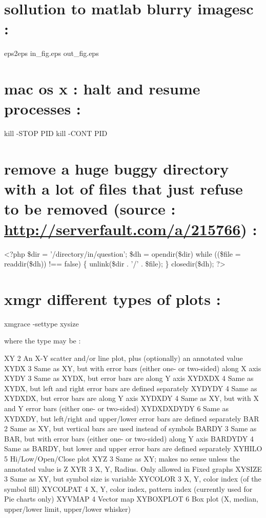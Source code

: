 \documentclass[11pt]{article}
\begin{document}
\section{sollution to matlab blurry imagesc :}
\label{sec-36}

eps2eps in\_fig.eps out\_fig.eps
\section{mac os x : halt and resume processes :}
\label{sec-37}
kill -STOP PID
kill -CONT PID
\section{remove a huge buggy directory with a lot of files that just refuse to be removed  (source : \url{http://serverfault.com/a/215766}) :}
\label{sec-38}

<?php 
\$dir = '/directory/in/question';
\$dh = opendir(\$dir)  
while ((\$file = readdir(\$dh)) !== false) \{ 
    unlink(\$dir . '/' . \$file); 
\} 
closedir(\$dh); 
?>

\section{xmgr different types of plots :}
\label{sec-39}
xmgrace -settype xysize

where the type may be :

XY               2         An X-Y scatter and/or line plot, plus (optionally) an annotated value
XYDX               3         Same as XY, but with error bars (either one- or two-sided) along X axis
XYDY               3         Same as XYDX, but error bars are along Y axis
XYDXDX               4         Same as XYDX, but left and right error bars are defined separately
XYDYDY               4         Same as XYDXDX, but error bars are along Y axis
XYDXDY               4         Same as XY, but with X and Y error bars (either one- or two-sided)
XYDXDXDYDY     6         Same as XYDXDY, but left/right and upper/lower error bars are defined separately
BAR               2         Same as XY, but vertical bars are used instead of symbols
BARDY               3         Same as BAR, but with error bars (either one- or two-sided) along Y axis
BARDYDY               4         Same as BARDY, but lower and upper error bars are defined separately
XYHILO               5         Hi/Low/Open/Close plot
XYZ               3              Same as XY; makes no sense unless the annotated value is Z
XYR               3         X, Y, Radius. Only allowed in Fixed graphs
XYSIZE               3         Same as XY, but symbol size is variable
XYCOLOR               3         X, Y, color index (of the symbol fill)
XYCOLPAT       4         X, Y, color index, pattern index (currently used for Pie charts only)
XYVMAP               4         Vector map
XYBOXPLOT      6         Box plot (X, median, upper/lower limit, upper/lower whisker)
\end{document}
